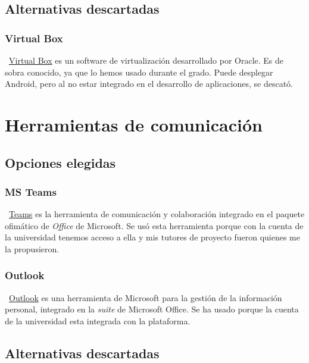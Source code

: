 \subsection{Alternativas descartadas}

\subsubsection{Virtual Box}
~\href{https://www.virtualbox.org/}{Virtual Box} es un software de virtualización desarrollado por Oracle. Es de sobra conocido, ya que lo hemos usado durante el grado. Puede desplegar Android, pero al no estar integrado en el desarrollo de aplicaciones, se descató.


\section{Herramientas de comunicación}

\subsection{Opciones elegidas}

\subsubsection{MS Teams}
~\href{https://www.microsoft.com/es-ww/microsoft-365/microsoft-teams/download-app}{Teams} es la herramienta de comunicación y colaboración integrado en el paquete ofimático de \emph{Office} de Microsoft. Se usó esta herramienta porque con la cuenta de la universidad tenemos acceso a ella y mis tutores de proyecto fueron quienes me la propusieron.

\subsubsection{Outlook}
~\href{https://www.microsoft.com/es-es/microsoft-365/outlook/email-and-calendar-software-microsoft-outlook}{Outlook} es una herramienta de Microsoft para la gestión de la información personal, integrado en la \emph{suite} de Microsoft Office. Se ha usado porque la cuenta de la universidad esta integrada con la plataforma.

\subsection{Alternativas descartadas}

